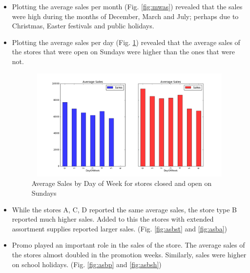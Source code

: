 \documentclass[12pt,a4paper]{article}
\begin{document}
\begin{itemize}    
	\item Plotting the average sales per month (Fig. \ref{fig:mwas}) revealed that the sales were high during the months of December, March and July; perhaps due to Christmas, Easter festivals and public holidays. 
	\item Plotting the average sales per day (Fig. \ref{fig:asbdow}) revealed that the average sales of the stores that were open on Sundays were higher than the ones that were not.
	      		    
	      \begin{figure}[H]
	      	\centering
	      	\hspace*{-0.5in}
	      	\includegraphics[width=1.25\textwidth, height=2.2in]{images/AvgSalesByDayOfWeek.png}
	      	\caption{Average Sales by Day of Week for stores closed and open on Sundays}
	      	\label{fig:asbdow}
	      \end{figure}
	          
	\item While the stores A, C, D reported the same average sales, the store type B reported much higher sales. Added to this the stores with extended assortment supplies reported larger sales. (Fig. \ref{fig:asbst} and \ref{fig:asba})
	          
	\item Promo played an important role in the sales of the store. The average sales of the stores almost doubled in the promotion weeks. Similarly, sales were higher on school holidays. (Fig. \ref{fig:asbp} and \ref{fig:asbsh})
	      		    

\end{itemize}
\end{document}
